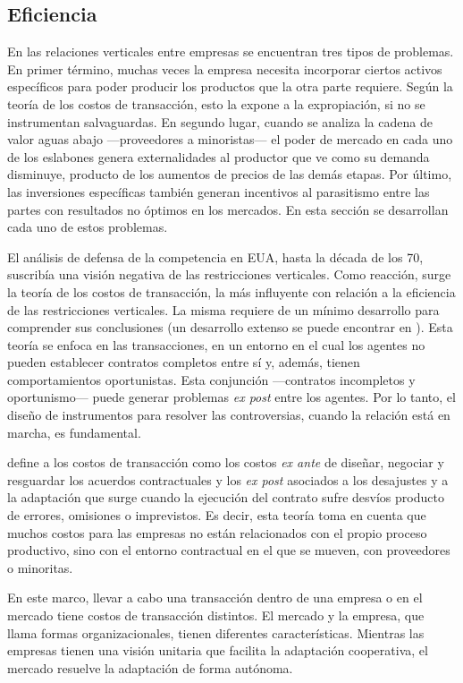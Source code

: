 \documentclass[
  12pt,
  spanish,
]{book}
\begin{document}
\hypertarget{eficiencia}{%
\subsection{Eficiencia}\label{eficiencia}}

En las relaciones verticales entre empresas se encuentran tres tipos de
problemas. En primer término, muchas veces la empresa necesita
incorporar ciertos activos específicos para poder producir los productos
que la otra parte requiere. Según la teoría de los costos de
transacción, esto la expone a la expropiación, si no se instrumentan
salvaguardas. En segundo lugar, cuando se analiza la cadena de valor
aguas abajo ---proveedores a minoristas--- el poder de mercado en cada
uno de los eslabones genera externalidades al productor que ve como su
demanda disminuye, producto de los aumentos de precios de las demás
etapas. Por último, las inversiones específicas también generan
incentivos al parasitismo entre las partes con resultados no óptimos en
los mercados. En esta sección se desarrollan cada uno de estos
problemas.

El análisis de defensa de la competencia en EUA, hasta la década de los
70, suscribía una visión negativa de las restricciones verticales. Como
reacción, surge la teoría de los costos de transacción, la más
influyente con relación a la eficiencia de las restricciones verticales.
La misma requiere de un mínimo desarrollo para comprender sus
conclusiones (un desarrollo extenso se puede encontrar en
\citet{Williamson1998}). Esta teoría se enfoca en las transacciones, en
un entorno en el cual los agentes no pueden establecer contratos
completos entre sí y, además, tienen comportamientos oportunistas. Esta
conjunción ---contratos incompletos y oportunismo--- puede generar
problemas \emph{ex post} entre los agentes. Por lo tanto, el diseño de
instrumentos para resolver las controversias, cuando la relación está en
marcha, es fundamental.

\citet{Williamson1998} define a los costos de transacción como los
costos \emph{ex ante} de diseñar, negociar y resguardar los acuerdos
contractuales y los \emph{ex post} asociados a los desajustes y a la
adaptación que surge cuando la ejecución del contrato sufre desvíos
producto de errores, omisiones o imprevistos. Es decir, esta teoría toma
en cuenta que muchos costos para las empresas no están relacionados con
el propio proceso productivo, sino con el entorno contractual en el que
se mueven, con proveedores o minoritas.

En este marco, llevar a cabo una transacción dentro de una empresa o en
el mercado tiene costos de transacción distintos. El mercado y la
empresa, que \citet{Williamson1998} llama formas organizacionales,
tienen diferentes características. Mientras las empresas tienen una
visión unitaria que facilita la adaptación cooperativa, el mercado
resuelve la adaptación de forma autónoma.
\end{document}
